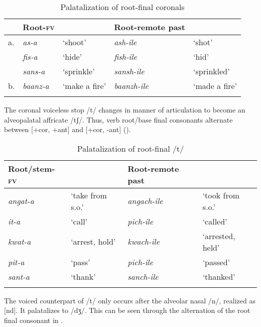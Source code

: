\documentclass[output=paper]{langsci/langscibook}
\begin{document}
\begin{table}
\begin{tabularx}{\textwidth}{lXXlX}
\lsptoprule
 & Root-\textsc{fv} &  & Root-remote past & \\
\midrule
a. & \textit{as-a} & `shoot' & \textit{ash-ile} & `shot' \\
 & \textit{fis-a} & `hide' & \textit{fish-ile} & `hid' \\
 & \textit{sans-a} & `sprinkle' & \textit{sansh-ile} & `sprinkled' \\
\tablevspace
b. & \textit{baanz-a} & `make a fire' & \textit{baanzh-ile} & `made a fire' \\

\lspbottomrule
\end{tabularx}

\caption{Palatalization of root-final coronals}
\label{tab:9.kawasha}

 \end{table}


The coronal voiceless stop /t/ changes in manner of articulation to become an alveopalatal affricate /tʃ/. Thus, verb root/base final consonants alternate between [+cor, +ant] and [+cor, -ant] ().


\begin{table}
\begin{tabularx}{\textwidth}{XXXX}
\lsptoprule
Root/stem-\textsc{fv} &  & Root-remote past & \\
\midrule
\textit{angat-a} & `take from s.o.' & \textit{angach-ile} & `took from s.o.' \\
\textit{it-a} & `call' & \textit{pich-ile} & `called' \\
\textit{kwat-a} & `arrest, hold' & \textit{kwach-ile} & `arrested, held' \\
\textit{pit-a} & `pass' & \textit{pich-ile} & `passed' \\
\textit{sant-a} & `thank' & \textit{sanch-ile} & `thanked' \\

\lspbottomrule
\end{tabularx}

\caption{Palatalization of root-final /t/}
\label{tab:10.kawasha}

 \end{table}




The voiced counterpart of /t/ only occurs after the alveolar nasal /n/, realized as [nd]. It palatalizes to /dʒ/. This can be seen through the alternation of the root final consonant in .
\end{document}

